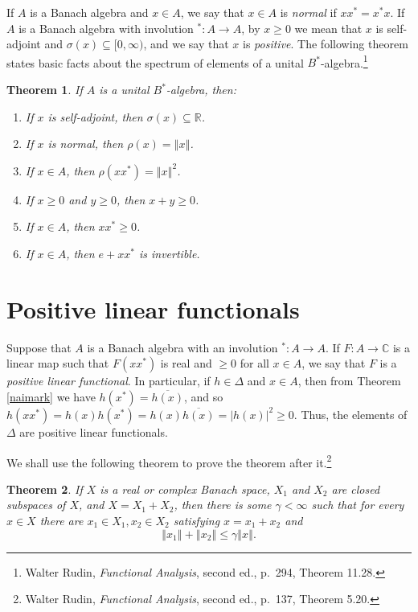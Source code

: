 \documentclass{article}
\newcommand{\norm}[1]{\left\Vert #1 \right\Vert}
\newtheorem{theorem}{Theorem}
\theoremstyle{definition}
\begin{document}
If $A$ is a Banach algebra and $x \in A$, we say that $x \in A$ is {\em normal} if $xx^*=x^*x$. If $A$ is a Banach algebra with involution $^*:A \to A$, 
by $x \geq 0$ we mean that $x$ is self-adjoint and $\sigma(x) \subseteq [0,\infty)$, and we say that $x$ is {\em positive}.
The following theorem states basic facts about the spectrum of elements of a unital $B^*$-algebra.\footnote{Walter Rudin, {\em Functional Analysis}, second ed., p.~294, Theorem 11.28.}

\begin{theorem}
If $A$ is a unital $B^*$-algebra, then:
\begin{enumerate}
\item If $x$ is self-adjoint, then $\sigma(x) \subseteq \mathbb{R}$.
\item If $x$ is normal, then $\rho(x)=\norm{x}$.
\item If $x \in A$, then $\rho(xx^*)=\norm{x}^2$.
\item If $x \geq 0$ and $y \geq 0$, then $x+y \geq 0$.
\item If $x \in A$, then $xx^* \geq 0$.
\item If $x \in A$, then $e+xx^*$ is invertible.
\end{enumerate}
\label{Balgebra}
\end{theorem}


\section{Positive linear functionals}
Suppose that $A$ is a Banach algebra with an involution $^*:A \to A$. If $F:A \to \mathbb{C}$ is a linear map such that $F(xx^*)$ is real and  $\geq 0$ for all $x \in A$,
we say that $F$ is a {\em positive linear functional}. In particular, if $h \in \Delta$ and $x \in A$, then from Theorem \ref{naimark} we have
$h(x^*)=\overline{h(x)}$, and so $h(xx^*)=h(x)h(x^*)=h(x)\overline{h(x)}=|h(x)|^2 \geq 0$. Thus, the elements of $\Delta$ are positive linear functionals.


We shall use the following theorem to prove the theorem after it.\footnote{Walter
Rudin, {\em Functional Analysis}, second ed., p.~137, Theorem 5.20.}

\begin{theorem}
If $X$ is a real or complex Banach space, $X_1$ and $X_2$ are closed subspaces of $X$, and $X=X_1+X_2$, then there is some
$\gamma<\infty$ such that for every $x \in X$ there are $x_1 \in X_1, x_2 \in X_2$ satisfying $x=x_1+x_2$ and
\[
\norm{x_1}+\norm{x_2} \leq \gamma\norm{x}.
\]
\label{520}
\end{theorem}
\end{document}
